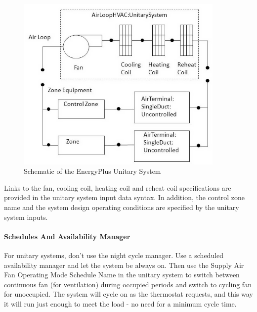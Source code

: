 \begin{figure}[hbtp] %
\centering
\includegraphics[width=0.9\textwidth, height=0.9\textheight, keepaspectratio=true]{media/image294.png}
\caption{Schematic of the EnergyPlus Unitary System \protect \label{fig:schematic-of-the-energyplus-unitary-system}}
\end{figure}

Links to the fan, cooling coil, heating coil and reheat coil specifications are provided in the unitary system input data syntax. In addition, the control zone name and the system design operating conditions are specified by the unitary system inputs.

\paragraph{Schedules And Availability Manager}\label{schedules-and-availability-manager}

For unitary systems, don't use the night cycle manager. Use a scheduled availability manager and let the system be always on. Then use the Supply Air Fan Operating Mode Schedule Name in the unitary system to switch between continuous fan (for ventilation) during occupied periods and switch to cycling fan for unoccupied. The system will cycle on as the thermostat requests, and this way it will run just enough to meet the load - no need for a minimum cycle time.

